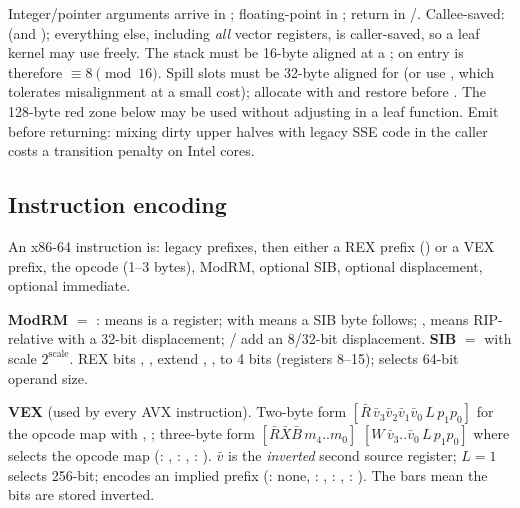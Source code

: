 Integer/pointer arguments arrive in ; floating-point in ; return in /. Callee-saved:  (and ); everything else, including \emph{all} vector registers, is caller-saved, so a leaf kernel may use  freely. The stack must be 16-byte aligned at a ; on entry  is therefore $\equiv 8 \pmod{16}$. Spill slots must be 32-byte aligned for  (or use , which tolerates misalignment at a small cost); allocate with  and restore before . The 128-byte red zone below  may be used without adjusting  in a leaf function. Emit  before returning: mixing dirty upper  halves with legacy SSE code in the caller costs a transition penalty on Intel cores.

\subsection{Instruction encoding}

An x86-64 instruction is: legacy prefixes, then either a REX prefix () or a VEX prefix, the opcode (1--3 bytes), ModRM, optional SIB, optional displacement, optional immediate.

\textbf{ModRM} $=$ :  means  is a register;  with  means a SIB byte follows; ,  means RIP-relative with a 32-bit displacement; / add an 8/32-bit displacement. \textbf{SIB} $=$  with scale $2^{\text{scale}}$. REX bits , ,  extend , ,  to 4 bits (registers 8--15);  selects 64-bit operand size.

\textbf{VEX} (used by every AVX instruction). Two-byte form  $[\bar{R}\,\bar{v}_3\bar{v}_2\bar{v}_1\bar{v}_0\,L\,p_1p_0]$ for the  opcode map with , ; three-byte form  $[\bar{R}\bar{X}\bar{B}\,m_4..m_0]$ $[W\,\bar{v}_3..\bar{v}_0\,L\,p_1p_0]$ where  selects the opcode map (: , : , : ). $\bar{v}$ is the \emph{inverted} second source register; $L=1$ selects 256-bit;  encodes an implied prefix (: none, : , : , : ). The bars mean the bits are stored inverted.

